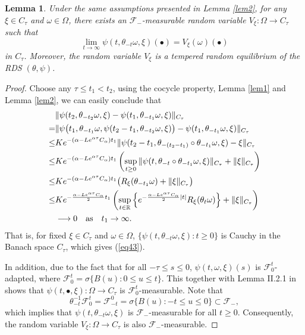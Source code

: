 \documentclass[preprint,12pt]{elsarticle}
\newtheorem{lemma}{Lemma}[section]
\begin{document}
\begin{lemma}\label{lem3}
Under the same assumptions presented in Lemma \ref{lem2}, for any $\xi\in C_\tau$ and $\omega\in\Omega$, there exists an $\mathscr{F}_-$-measurable random variable $V_\xi:\Omega\rightarrow C_\tau$ such that
\begin{equation}\label{eq43}
\lim_{t\rightarrow\infty}\psi(t,\theta_{-t}\omega,\xi)(\bullet)=V_\xi(\omega)(\bullet)
\end{equation}
in $C_\tau$. Moreover, the random variable $V_\xi$ is a tempered random equilibrium of the RDS $(\theta,\psi)$.
\end{lemma}
\begin{proof}
Choose any $\tau\leq t_1<t_2$, using the cocycle property, Lemma \ref{lem1} and Lemma \ref{lem2}, we can easily conclude that
\begin{align}\label{eq44}
&\|\psi(t_2,\theta_{-t_2}\omega,\xi)-\psi(t_1,\theta_{-t_1}\omega,\xi)\|_{C_\tau}\nonumber\\
=&\|\psi\bigl(t_1,\theta_{-t_1}\omega,\psi(t_2-t_1,\theta_{-t_2}\omega,\xi)\bigr)-\psi(t_1,\theta_{-t_1}\omega,\xi)\|_{C_\tau}\nonumber\\
\leq&K e^{-(\alpha-Le^{\alpha\tau}C_\alpha)t_1}\|\psi(t_2-t_1,\theta_{-(t_2-t_1)}\circ\theta_{-t_1}\omega,\xi)-\xi\|_{C_\tau}\nonumber\\
\leq&K e^{-(\alpha-Le^{\alpha\tau}C_\alpha)t_1}\left(\sup_{t\geq0}\|\psi(t,\theta_{-t}\circ\theta_{-t_1}\omega,\xi)\|_{C_\tau}+\|\xi\|_{C_\tau}\right)\nonumber\\
\leq&K e^{-(\alpha-Le^{\alpha\tau}C_\alpha)t_1}\bigl(R_\xi(\theta_{-t_1}\omega)+\|\xi\|_{C_\tau}\bigr)\nonumber\\
\leq&K e^{-\frac{\alpha-Le^{\alpha\tau}C_\alpha}{2}t_1}\left(\sup_{t\in\mathbb{R}}\left\{e^{-\frac{\alpha-Le^{\alpha\tau}C_\alpha}{2}|t|}R_\xi(\theta_{t}\omega)\right\}+\|\xi\|_{C_\tau}\right)\nonumber\\
&\longrightarrow0\quad {\rm as}\quad t_1\rightarrow\infty.
\end{align}
That is, for fixed $\xi\in C_\tau$ and $\omega\in\Omega$, $\{\psi(t,\theta_{-t}\omega,\xi):t\geq0\}$ is Cauchy in the Banach space $C_\tau$, which gives  (\ref{eq43}).

In addition, due to the fact that for all $-\tau\leq s\leq0$, $\psi(t,\omega,\xi)(s)$ is $\mathscr{F}_0^t$-adapted, where $\mathscr{F}_0^t=\sigma\{B(u):0\leq u\leq t\}$. This together with Lemma II.2.1 in \cite{Mo} shows that $\psi(t,\bullet,\xi):\Omega\rightarrow C_\tau$ is $\mathscr{F}_0^t$-measurable. Note that \begin{equation}\label{eq45}\theta_{-t}^{-1}\mathscr{F}_0^t=\mathscr{F}_{-t}^0=\sigma\{B(u):-t\leq u\leq 0\}\subset\mathscr{F}_-,\end{equation}
which implies that $\psi(t,\theta_{-t}\omega,\xi)$ is $\mathscr{F}_-$-measurable for all $t\geq0$. Consequently, the random variable $V_\xi:\Omega\rightarrow C_\tau$ is also $\mathscr{F}_-$-measurable.


\end{proof}
\end{document}
